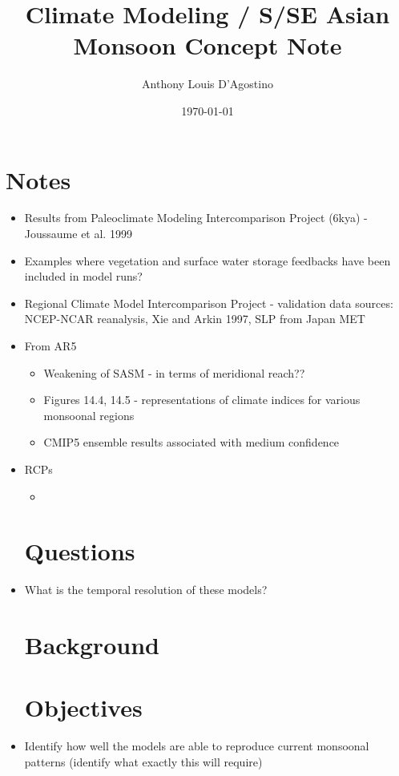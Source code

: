\documentclass[11pt,reqno]{amsart}
\title{Climate Modeling / S/SE Asian Monsoon Concept Note}
\date{\today}
\author{Anthony Louis D'Agostino}
\begin{document}
\maketitle

\section{Notes}

\begin{itemize}
\item Results from Paleoclimate Modeling Intercomparison Project (6kya) - Joussaume et al. 1999 
\item Examples where vegetation and surface water storage feedbacks have been included in model runs?  

\item Regional Climate Model Intercomparison Project - validation data sources: NCEP-NCAR reanalysis, Xie and Arkin 1997, SLP from Japan MET 


\item From AR5
	\begin{itemize}
		\item Weakening of SASM - in terms of meridional reach?? 
		\item Figures 14.4, 14.5 - representations of climate indices for various monsoonal regions 
		\item CMIP5 ensemble results associated with medium confidence 
	\end{itemize}


\item RCPs
	\begin{itemize}
		\item  
	\end{itemize}


\section{Questions}
\item What is the temporal resolution of these models? 	
	
	



\section{Background}


\section{Objectives}
\item Identify how well the models are able to reproduce current monsoonal patterns (identify what exactly this will require) 


\end{itemize}
\end{document}

